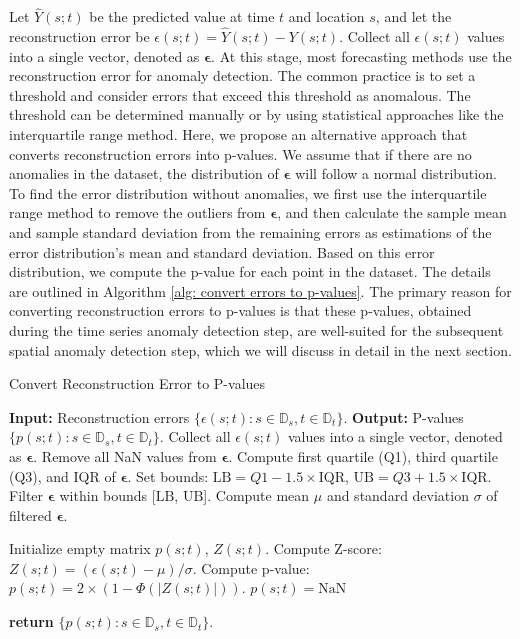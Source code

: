 \documentclass[11pt]{article}
\begin{document}
Let $\hat{Y}(s;t)$ be the predicted value at time $t$ and location $s$, and let the reconstruction error be $\epsilon(s;t)=\hat{Y}(s;t)-Y(s;t)$. Collect all $\epsilon(s;t)$ values into a single vector, denoted as $\bm{\epsilon}$. At this stage, most forecasting methods use the reconstruction error for anomaly detection. The common practice is to set a threshold and consider errors that exceed this threshold as anomalous. The threshold can be determined manually or by using statistical approaches like the interquartile range method. Here, we propose an alternative approach that converts reconstruction errors into p-values. We assume that if there are no anomalies in the dataset, the distribution of $\bm{\epsilon}$ will follow a normal distribution. To find the error distribution without anomalies, we first use the interquartile range method to remove the outliers from $\bm{\epsilon}$, and then calculate the sample mean and sample standard deviation from the remaining errors as estimations of the error distribution's mean and standard deviation. Based on this error distribution, we compute the p-value for each point in the dataset. The details are outlined in Algorithm \ref{alg: convert errors to p-values}. The primary reason for converting reconstruction errors to p-values is that these p-values, obtained during the time series anomaly detection step, are well-suited for the subsequent spatial anomaly detection step, which we will discuss in detail in the next section.




\begin{algorithm}
\caption{Convert Reconstruction Error to P-values}\label{alg: convert errors to p-values}
\begin{algorithmic}[1]
\State \textbf{Input:} Reconstruction errors $\{\epsilon(s;t):s\in \mathbb{D}_s, t\in \mathbb{D}_t\}$.
\State \textbf{Output:} P-values $\{p(s;t):s\in \mathbb{D}_s, t\in \mathbb{D}_t\}$.
\State Collect all $\epsilon(s;t)$ values into a single vector, denoted as $\bm{\epsilon}$.
\State Remove all NaN values from $\bm{\epsilon}$.
\State Compute first quartile (Q1), third quartile (Q3), and IQR of $\bm{\epsilon}$.
\State Set bounds: $\text{LB} = Q1 - 1.5 \times \text{IQR}$, $\text{UB} = Q3 + 1.5 \times \text{IQR}$.
\State Filter $\bm{\epsilon}$ within bounds [$\text{LB}$, $\text{UB}$].
\State Compute mean $\mu$ and standard deviation $\sigma$ of filtered $\bm{\epsilon}$.

\State Initialize empty matrix $p(s;t)$, $Z(s;t)$.
            \State Compute Z-score: $Z(s;t) = (\epsilon(s;t) - \mu)/\sigma$.
            \State Compute p-value: $p(s;t) = 2 \times (1 - \Phi(|Z(s;t)|))$.
        \Else
            \State $p(s;t) = \text{NaN}$
        \EndIf
    \EndFor
\EndFor

\State \textbf{return} $\{p(s;t):s\in \mathbb{D}_s, t\in \mathbb{D}_t\}$.
\end{algorithmic}
\end{algorithm}
\end{document}
